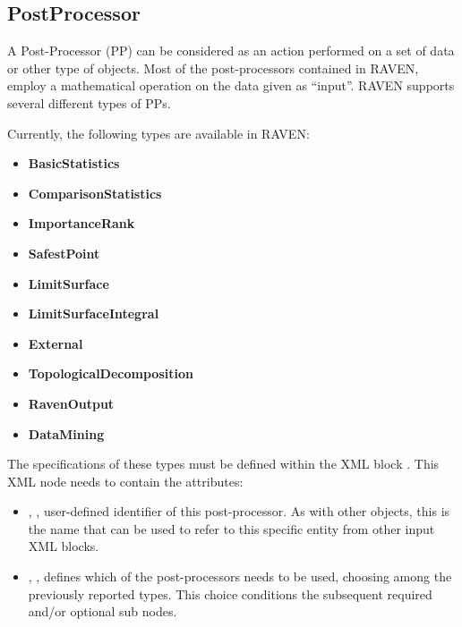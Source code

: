 \subsection{PostProcessor}
\label{sec:models_postProcessor}
A Post-Processor (PP) can be considered as an action performed on a set of data
or other type of objects.
%
Most of the post-processors contained in RAVEN, employ a mathematical operation
on the data given as ``input''.
%
RAVEN supports several different types of PPs.

Currently, the following types are available in RAVEN:
\begin{itemize}
  \itemsep0em
  \item \textbf{BasicStatistics}
  \item \textbf{ComparisonStatistics}
  \item \textbf{ImportanceRank}
  \item \textbf{SafestPoint}
  \item \textbf{LimitSurface}
  \item \textbf{LimitSurfaceIntegral}
  \item \textbf{External}
  \item \textbf{TopologicalDecomposition}
  \item \textbf{RavenOutput}
  \item \textbf{DataMining}
\end{itemize}

The specifications of these types must be defined within the XML block
.
%
This XML node needs to contain the attributes:
\vspace{-5mm}
\begin{itemize}
  \itemsep0em
  \item {}, , user-defined
  identifier of this post-processor.
  \nb As with other objects, this is the name that can be used to refer to this
  specific entity from other input XML blocks.
  \item {}, , defines which of
  the post-processors needs to be used, choosing among the previously reported
  types.
  This choice conditions the subsequent required and/or optional
   sub nodes.
\end{itemize}
\vspace{-5mm}

